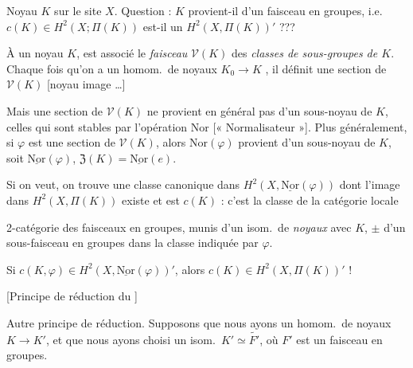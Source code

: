 \documentclass[11pt,a4paper]{article}
\begin{document}

Noyau $K$ sur le site $X$. Question : $K$ provient-il d'un faisceau en
groupes, i.e.\ $c(K) \in H^2(X; \Pi(K))$ est-il un
 $H^2(X,\Pi(K))'$ ???


À un noyau $K$, est associé le \emph{faisceau} $\mathcal{V}(K)$ des
\emph{classes de sous-groupes de $K$}. 
Chaque fois qu'on a un homom.\ de noyaux $K_0 \to K$
, il définit une section de $\mathcal{V}(K)$
[noyau image \ldots]

 Mais une section de $\mathcal{V}(K)$ ne provient
en général pas d'un sous-noyau de $K$,  celles qui sont
stables par l'opération $\mathrm{Nor}$ [« Normalisateur »]. Plus
généralement, si $\varphi$ est une section de $\mathcal{V}(K)$, alors
$\mathrm{Nor}(\varphi)$ provient d'un sous-noyau de $K$, soit
$\underline{\mathrm{Nor}}(\varphi)$,  $\mathfrak{Z}(K) =
\underline{\mathrm{Nor}}(e)$.

 Si on veut, on trouve une
classe canonique dans $H^2(X, \underline{\mathrm{Nor}}(\varphi))$
dont l'image dans $H^2(X, \Pi(K))$ existe et est $c(K)$ :
\struck{\ill{} \ill{}} c'est la classe de la catégorie locale


2-catégorie des faisceaux en groupes, munis d'un
isom.\ de \emph{noyaux} avec $K$, $\pm$ d'un sous-faisceau
en groupes dans la classe indiquée par $\varphi$.

Si $c(K,\varphi) \in H^2(X, \underline{\mathrm{Nor}}(\varphi))'$, alors
$c(K) \in H^2(X, \Pi(K))'$ !

[Principe de réduction du \ill{}]

Autre principe de réduction. Supposons que nous ayons
un homom.\ de noyaux 
$K \to K'$, et que nous ayons choisi un isom.\ $K' \simeq \widetilde{F'}$, où
$F'$ est un faisceau en groupes.
\end{document}
